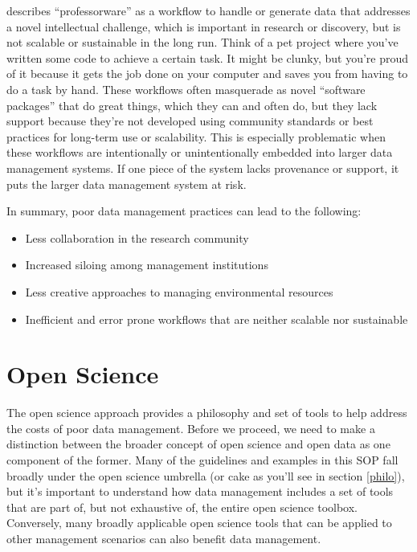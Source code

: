 \documentclass[
]{book}
\providecommand{\tightlist}{%
  \setlength{\itemsep}{0pt}\setlength{\parskip}{0pt}}
\begin{document}
\citet{Mons18} describes ``professorware'' as a workflow to handle or generate data that addresses a novel intellectual challenge, which is important in research or discovery, but is not scalable or sustainable in the long run. Think of a pet project where you've written some code to achieve a certain task. It might be clunky, but you're proud of it because it gets the job done on your computer and saves you from having to do a task by hand. These workflows often masquerade as novel ``software packages'' that do great things, which they can and often do, but they lack support because they're not developed using community standards or best practices for long-term use or scalability. This is especially problematic when these workflows are intentionally or unintentionally embedded into larger data management systems. If one piece of the system lacks provenance or support, it puts the larger data management system at risk.

In summary, poor data management practices can lead to the following:

\begin{itemize}
\tightlist
\item
  Less collaboration in the research community
\item
  Increased siloing among management institutions
\item
  Less creative approaches to managing environmental resources
\item
  Inefficient and error prone workflows that are neither scalable nor sustainable
\end{itemize}

\hypertarget{opengeneral}{%
\section{Open Science}\label{opengeneral}}

The open science approach provides a philosophy and set of tools to help address the costs of poor data management. Before we proceed, we need to make a distinction between the broader concept of open science and open data as one component of the former. Many of the guidelines and examples in this SOP fall broadly under the open science umbrella (or cake as you'll see in section \ref{philo}), but it's important to understand how data management includes a set of tools that are part of, but not exhaustive of, the entire open science toolbox. Conversely, many broadly applicable open science tools that can be applied to other management scenarios can also benefit data management.
\end{document}
